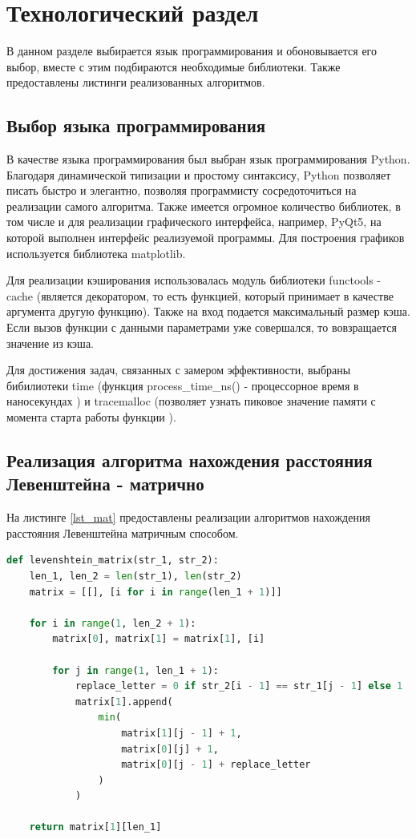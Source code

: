 \chapter{Технологический раздел}
В данном разделе выбирается язык программирования и обоновывается его выбор, вместе с этим подбираются необходимые библиотеки. Также предоставлены листинги реализованных алгоритмов.

\section{Выбор языка программирования}
В качестве языка программирования был выбран язык программирования Python. Благодаря динамической типизации и простому синтаксису, Python позволяет писать быстро и элегантно, позволяя программисту сосредоточиться на реализации самого алгоритма. Также имеется огромное количество библиотек, в том числе и для реализации графического интерфейса, например, PyQt5, на которой выполнен интерфейс реализуемой программы. Для построения графиков используется библиотека matplotlib.

Для реализации кэширования использовалась модуль библиотеки functools - cache (является декоратором, то есть функцией, который принимает в качестве аргумента другую функцию). Также на вход подается максимальный размер кэша. Если вызов функции с данными параметрами уже совершался, то вовзращается значение из кэша. \cite{cache}

Для достижения задач, связанных с замером эффективности, выбраны бибилиотеки time (функция process\_time\_ns() - процессорное время в наносекундах \cite{process_time}) и tracemalloc (позволяет узнать пиковое значение памяти с момента старта работы функции \cite{tracemalloc}).

\section{Реализация алгоритма нахождения расстояния Левенштейна - матрично}
На листинге \ref{lst_mat} предоставлены реализации алгоритмов нахождения расстояния Левенштейна матричным способом.
\begin{lstlisting}[language=Python, caption=Реализация алгоритма Левенштейна матричным способом, label=lst_mat]
def levenshtein_matrix(str_1, str_2):
	len_1, len_2 = len(str_1), len(str_2)
	matrix = [[], [i for i in range(len_1 + 1)]]

	for i in range(1, len_2 + 1):
		matrix[0], matrix[1] = matrix[1], [i]

		for j in range(1, len_1 + 1):
			replace_letter = 0 if str_2[i - 1] == str_1[j - 1] else 1
			matrix[1].append(
				min(
					matrix[1][j - 1] + 1,
					matrix[0][j] + 1,
					matrix[0][j - 1] + replace_letter
				)
			)

	return matrix[1][len_1]
\end{lstlisting}


